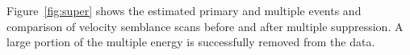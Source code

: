 Figure~\ref{fig:super} shows the estimated primary and multiple events
and comparison of velocity semblance scans before and after multiple
suppression. A large portion of the multiple energy is successfully
removed from the data.


\begin{comment}

\section{From plane-wave construction to shaping}

Shaping \cite[]{shape} is a powerful approach to
regularization. Shaping acts as a smoothing operator that projects the
estimated model into the space of acceptable models.

To transform plane-wave construction to shaping, we can use the
prediction operator~$\mathbf{P}$ from equation~(\ref{eq:d}) and define
a box smoother of length $k$ as
\begin{equation}
  \label{eq:bk}
  \mathbf{B}_k = \frac{1}{k}\,\left(\mathbf{I}_N + \mathbf{P} + 
  \mathbf{P}^2 + \cdots +  \mathbf{P}^k\right)\;.
\end{equation}
Implementing equation~(\ref{eq:bk}) directly requires many computational
operations. Noting that
\begin{equation}
  \label{eq:rec}
  \left(\mathbf{I}_N - \mathbf{P}\right)\,\mathbf{B}_k =
    \frac{1}{k}\,\left(\mathbf{I}_N - \mathbf{P}^{k+1}\right)\;,
\end{equation}
we can rewrite equation~(\ref{eq:bk}) in the compact form
\begin{equation}
  \label{eq:bcomp}
  \mathbf{B}_k = 
  \frac{1}{k}\,\left(\mathbf{I}_N - \mathbf{P}\right)^{-1}\,
  \left(\mathbf{I}_N - \mathbf{P}^{k+1}\right) = \frac{1}{k}\,\mathbf{C}\,\left(\mathbf{I}_N - \mathbf{P}^{k+1}\right)\;,
\end{equation}
which can be implemented economically.  Finally, combining two
generalized box smoothers creates a symmetric generalized triangle smoothing operator suitable for shaping regularization
\begin{equation}
  \label{eq:tk}
  \mathbf{T}_k = \mathbf{B}_k^T\,\mathbf{B}_k\;.
\end{equation}
A triangle shaper uses local predictions from both the left and the
right neighbors of a record and averages with triangle weights.


\end{comment}
